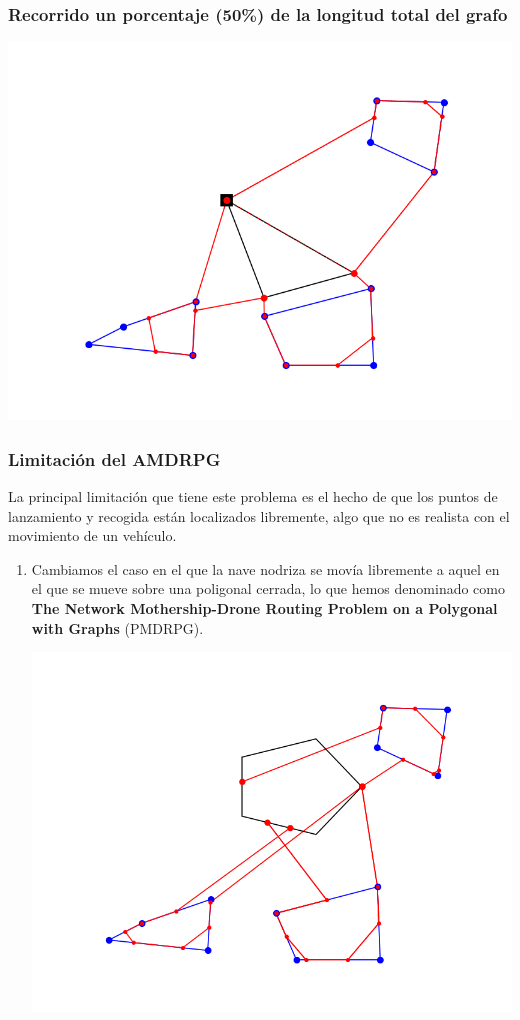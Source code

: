 \documentclass[slidestop,usepdftitle=false, xcolor=table]{beamer}
\begin{document}
	\begin{frame}
		\frametitle{Recorrido un porcentaje (50\%) de la longitud total del grafo}
		\begin{center}
			\includegraphics[width=0.8\linewidth]{PDMTZ_g}
		\end{center}
	\end{frame}

	\begin{frame}
		\frametitle{Limitación del AMDRPG}
		La principal limitación que tiene este problema es el hecho de que los puntos de lanzamiento y recogida están localizados libremente, algo que no es realista con el movimiento de un vehículo.
		\begin{small}
		\begin{enumerate}
			\item Cambiamos el caso en el que la nave nodriza se movía libremente a aquel en el que se mueve sobre una poligonal cerrada, lo que hemos denominado como \textbf{The Network Mothership-Drone Routing Problem on a Polygonal with Graphs} (PMDRPG). 
			\begin{center}
				\includegraphics[width=0.5\linewidth]{TDMTZ}
			\end{center}
		\end{enumerate}
	\end{small}
	\end{frame}
\end{document}
